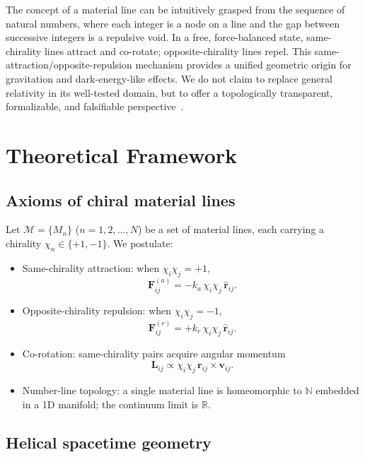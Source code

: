 \documentclass[12pt,a4paper]{article}
\begin{document}
The concept of a material line can be intuitively grasped from the sequence of natural numbers, where each integer is a node on a line and the gap between successive integers is a repulsive void. In a free, force-balanced state, same-chirality lines attract and co-rotate; opposite-chirality lines repel. This same-attraction/opposite-repulsion mechanism provides a unified geometric origin for gravitation and dark-energy-like effects. We do not claim to replace general relativity in its well-tested domain, but to offer a topologically transparent, formalizable, and falsifiable perspective~\cite{einstein1916,hubble1929,penrose2010,maldacena1998}.

\section*{Theoretical Framework}

\subsection*{Axioms of chiral material lines}

Let $\mathcal{M}=\{M_n\}$ ($n=1,2,\ldots,N$) be a set of material lines, each carrying a chirality $\chi_n\in\{+1,-1\}$. We postulate:
\begin{itemize}
    \item[(A1)] Same-chirality attraction: when $\chi_i\chi_j=+1$,
    \begin{equation}
        \mathbf{F}_{ij}^{(a)} = -k_a\,\chi_i\chi_j\,\hat{\mathbf{r}}_{ij}.
    \end{equation}
    \item[(A2)] Opposite-chirality repulsion: when $\chi_i\chi_j=-1$,
    \begin{equation}
        \mathbf{F}_{ij}^{(r)} = +k_r\,\chi_i\chi_j\,\hat{\mathbf{r}}_{ij}.
    \end{equation}
    \item[(A3)] Co-rotation: same-chirality pairs acquire angular momentum
    \begin{equation}
        \mathbf{L}_{ij} \propto \chi_i\chi_j\,\mathbf{r}_{ij}\times\mathbf{v}_{ij}.
    \end{equation}
    \item[(A4)] Number-line topology: a single material line is homeomorphic to $\mathbb{N}$ embedded in a 1D manifold; the continuum limit is $\mathbb{R}$.
\end{itemize}

\subsection*{Helical spacetime geometry}
\end{document}
